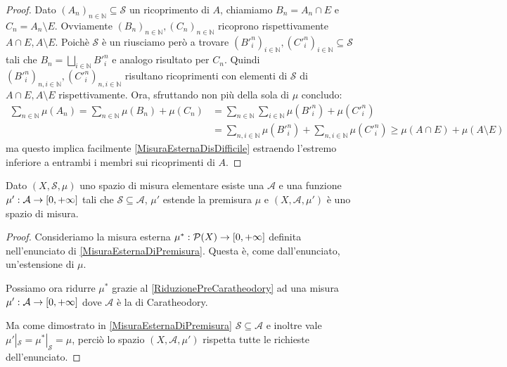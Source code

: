 \begin{proof}
	Dato $(A_n)_{n\in\mathbb N}\subseteq\mathcal S$ un ricoprimento di $A$, chiamiamo $B_n=A_n\cap E$ e $C_n=A_n\setminus E$. Ovviamente $(B_n)_{n\in\mathbb N},(C_n)_{n\in\mathbb N}$ ricoprono rispettivamente $A\cap E,A\setminus E$. Poichè $\mathcal S$ è un \semiring{} riusciamo però a trovare $(B'^n_i)_{i\in\mathbb N},(C'^n_i)_{i\in\mathbb N} \subseteq \mathcal S$ tali che $B_n=\bigsqcup_{i\in\mathbb N}B'^n_i$ e analogo risultato per $C_n$. Quindi $(B'^n_i)_{n,i\in\mathbb N}, (C'^n_i)_{n,i\in\mathbb N}$ risultano ricoprimenti con elementi di $\mathcal S$ di $A\cap E,A\setminus E$ rispettivamente.
	Ora, sfruttando non più della sola \sigadd[ità] di $\mu$ concludo:
	\begin{align*}
		\sum_{n\in\mathbb N}\mu(A_n)=\sum_{n\in\mathbb N} \mu(B_n)+\mu(C_n)&=
		\sum_{n\in\mathbb N}\sum_{i\in\mathbb N}\mu(B'^n_i)+\mu(C'^n_i)\\
		&=
		\sum_{n,i\in\mathbb N}\mu(B'^n_i)+\sum_{n,i\in\mathbb N}\mu(C'^n_i)\ge \mu(A\cap E)+\mu(A\setminus E)
	\end{align*}
	ma questo implica facilmente \cref{MisuraEsternaDisDifficile} estraendo l'estremo inferiore a entrambi i membri sui ricoprimenti di $A$.
\end{proof}

\begin{theorem}\label{EstensionexCaratheodory}
	Dato $(X,\mathcal S,\mu)$ uno spazio di misura elementare esiste una \sigalg{} $\mathcal A$ e una funzione $\mu':\mathcal A\to[0,+\infty]$ tali che $\mathcal S\subseteq \mathcal A$, $\mu'$ estende la premisura $\mu$ e $(X,\mathcal A,\mu')$ è uno spazio di misura.
\end{theorem}
\begin{proof}
	Consideriamo la misura esterna $\mu^*:\mathcal P(X)\to[0,+\infty]$ definita nell'enunciato di \cref{MisuraEsternaDiPremisura}. Questa è, come dall'enunciato, un'estensione di $\mu$.
	
	Possiamo ora ridurre $\mu^*$ grazie al \cref{RiduzionePreCaratheodory} ad una misura $\mu':\mathcal A\to[0,+\infty]$ dove $\mathcal A$ è la \sigalg{} di Caratheodory. 
	
	Ma come dimostrato in \cref{MisuraEsternaDiPremisura} $\mathcal S\subseteq\mathcal A$ e inoltre vale $\mu'|_{\mathcal S}=\mu^*|_{\mathcal S}=\mu$, perciò lo spazio $(X,\mathcal A,\mu')$ rispetta tutte le richieste dell'enunciato.
\end{proof}
